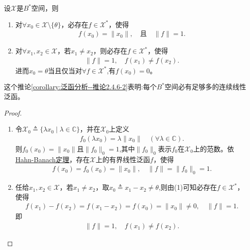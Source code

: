 \documentclass[../../main.tex]{subfiles}%
\begin{document}
\begin{corollary}\label{corollary:泛函分析--推论2.4.6}
设$\mathscr{X}$是$B^*$空间，则
\begin{enumerate}[(1)]
\item\label{corollary:泛函分析--推论2.4.6-1} 对$\forall x_0 \in \mathscr{X} \setminus \{\theta\}$，必存在$f \in \mathscr{X}^*$，使得
\begin{align*}
f(x_0) = \|x_0\|, \quad \text{且} \quad \|f\| = 1.
\end{align*}

\item\label{corollary:泛函分析--推论2.4.6-2} 对$\forall x_1, x_2 \in \mathscr{X}$，若$x_1 \neq x_2$，则必存在$f \in \mathscr{X}^*$，使得
\begin{align*}
\|f\| = 1,\quad f(x_1) \neq f(x_2).
\end{align*}
进而$x_0 = \theta$当且仅当对$\forall f \in \mathscr{X}^*$,有$f(x_0) = 0$。
\end{enumerate}
\end{corollary}
\begin{remark}
这个推论\ref{corollary:泛函分析--推论2.4.6-2}表明:每个$B^*$空间必有足够多的连续线性泛函。
\end{remark}
\begin{proof}
\begin{enumerate}[(1)]
\item 令$\mathscr{X}_0 \triangleq \{\lambda x_0 \mid \lambda \in \mathbb{C}\}$，并在$\mathscr{X}_0$上定义
\begin{align*}
f_0(\lambda x_0) = \lambda \|x_0\| \quad (\forall \lambda \in \mathbb{C}).
\end{align*}
则$f_0(x_0) = \|x_0\|$且$\|f_0\|_0 = 1$,其中$\|f_0\|_0$表示$f_0$在$\mathscr{X}_0$上的范数。依\hyperref[theorem:泛函分析--(哈恩-巴拿赫)Hahn-Banach定理]{Hahn-Banach定理}，存在$\mathscr{X}$上的有界线性泛函$f$，使得
\begin{align*}
f(x_0) = f_0(x_0) = \|x_0\|, \quad \|f\| = \|f_0\|_0 = 1.
\end{align*}

\item 任给$x_1, x_2 \in \mathscr{X}$，若$x_1 \neq x_2$，取$x_0 \triangleq x_1 - x_2 \neq \theta$,则由(1)可知必存在$f \in \mathscr{X}^*$，使得
\begin{align*}
f(x_1) - f(x_2) = f(x_1 - x_2) = f(x_0)=\|x_0\| \neq 0,\quad \|f\|=1.
\end{align*}
即
\begin{align*}
\|f\| = 1,\quad f(x_1) \neq f(x_2).
\end{align*}
\end{enumerate}
\end{proof}
\end{document}
